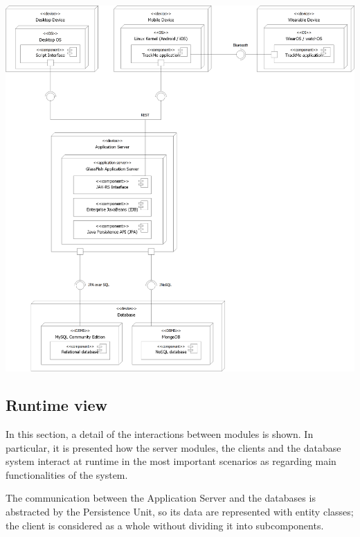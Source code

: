 \begin{center}
\includegraphics[scale=0.5]{sections/diagrams/deployment.png}
\newline
{}
\end{center}

\subsection{Runtime view}
In this section, a detail of the interactions between modules is shown. In particular, it is presented how the server modules, the clients and the database system interact at runtime in the most important scenarios as regarding main functionalities of the system.

The communication between the Application Server and the databases is abstracted by the Persistence Unit, so its data are represented with entity classes; the client is considered as a whole without dividing it into subcomponents.

